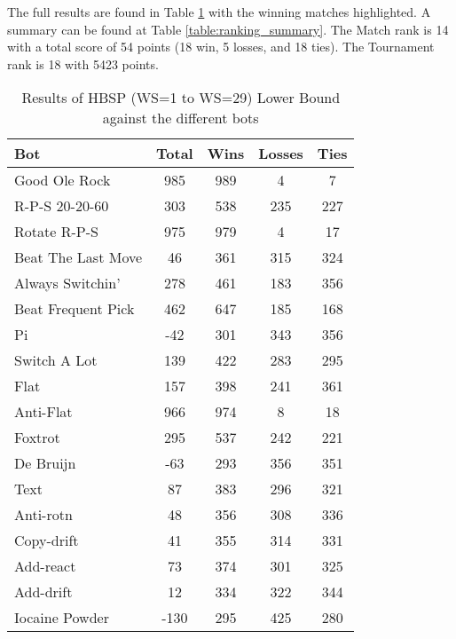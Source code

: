 The full results are found in Table \ref{table:JustPP_LowerBound_results} with the winning matches highlighted. A summary can be found at Table \ref{table:ranking_summary}. The Match rank is 14 with a total score of 54 points (18 win, 5 losses, and 18 ties). The Tournament rank is 18 with 5423 points.

\begin{table}
    \caption{Results of HBSP (WS=1 to WS=29) Lower Bound against the different bots}
    \label{table:JustPP_LowerBound_results}
    \centering
    \begin{tabular}{|l|c|c|c|c|}
        \hline
        \textbf{Bot} & \textbf{Total} & \textbf{Wins} & \textbf{Losses} & \textbf{Ties} \\ \hline
\rowcolor{HighlightRowColor} Good Ole Rock & 985 & 989 & 4 & 7 \\ \hline 
\rowcolor{HighlightRowColor} R-P-S 20-20-60 & 303 & 538 & 235 & 227 \\ \hline 
\rowcolor{HighlightRowColor} Rotate R-P-S & 975 & 979 & 4 & 17 \\ \hline 
Beat The Last Move & 46 & 361 & 315 & 324 \\ \hline 
\rowcolor{HighlightRowColor} Always Switchin' & 278 & 461 & 183 & 356 \\ \hline 
\rowcolor{HighlightRowColor} Beat Frequent Pick & 462 & 647 & 185 & 168 \\ \hline 
Pi & -42 & 301 & 343 & 356 \\ \hline 
\rowcolor{HighlightRowColor} Switch A Lot & 139 & 422 & 283 & 295 \\ \hline 
\rowcolor{HighlightRowColor} Flat & 157 & 398 & 241 & 361 \\ \hline 
\rowcolor{HighlightRowColor} Anti-Flat & 966 & 974 & 8 & 18 \\ \hline 
\rowcolor{HighlightRowColor} Foxtrot & 295 & 537 & 242 & 221 \\ \hline 
De Bruijn & -63 & 293 & 356 & 351 \\ \hline 
\rowcolor{HighlightRowColor} Text & 87 & 383 & 296 & 321 \\ \hline 
Anti-rotn & 48 & 356 & 308 & 336 \\ \hline 
Copy-drift & 41 & 355 & 314 & 331 \\ \hline 
\rowcolor{HighlightRowColor} Add-react & 73 & 374 & 301 & 325 \\ \hline 
Add-drift & 12 & 334 & 322 & 344 \\ \hline 
Iocaine Powder & -130 & 295 & 425 & 280 \\ \hline 

\end{tabular}
\end{table}
